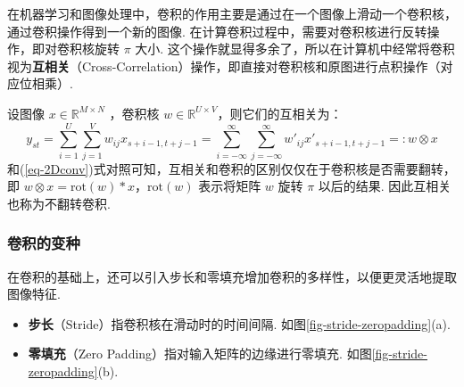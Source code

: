 \documentclass[12pt, a4paper, oneside]{ctexart}
\numberwithin{equation}{section}  %
\begin{document}
在机器学习和图像处理中，卷积的作用主要是通过在一个图像上滑动一个卷积核，通过卷积操作得到一个新的图像.
在计算卷积过程中，需要对卷积核进行反转操作，即对卷积核旋转 \(\pi\) 大小.
这个操作就显得多余了，所以在计算机中经常将卷积视为\textbf{互相关}（Cross-Correlation）操作，即直接对卷积核和原图进行点积操作（对应位相乘）.

设图像 \(x\in\mathbb{R}^{M\times N}\) ，卷积核
\(w\in\mathbb{R}^{U\times V}\)，则它们的互相关为：
\begin{equation}
   y_{st} = \sum_{i=1}^U\sum_{j=1}^Vw_{ij}x_{s+i-1,t+j-1} = \sum_{i=-\infty}^\infty\sum_{j=-\infty}^\infty w'_{ij}x'_{s+i-1,t+j-1}=:w\otimes x 
\end{equation}
和(\ref{eq-2Dconv})式对照可知，互相关和卷积的区别仅仅在于卷积核是否需要翻转，即
\(w\otimes x = \text{rot}(w)*x\)，\(\text{rot}(w)\) 表示将矩阵 \(w\)
旋转 \(\pi\) 以后的结果. 因此互相关也称为不翻转卷积.

\subsubsection{卷积的变种}

在卷积的基础上，还可以引入步长和零填充增加卷积的多样性，以便更灵活地提取图像特征.

\begin{itemize}
\item
  \textbf{步长}（Stride）指卷积核在滑动时的时间间隔. 如图\ref{fig-stride-zeropadding}(a).
\item
  \textbf{零填充}（Zero Padding）指对输入矩阵的边缘进行零填充. 如图\ref{fig-stride-zeropadding}(b).
\end{itemize}
\end{document}
